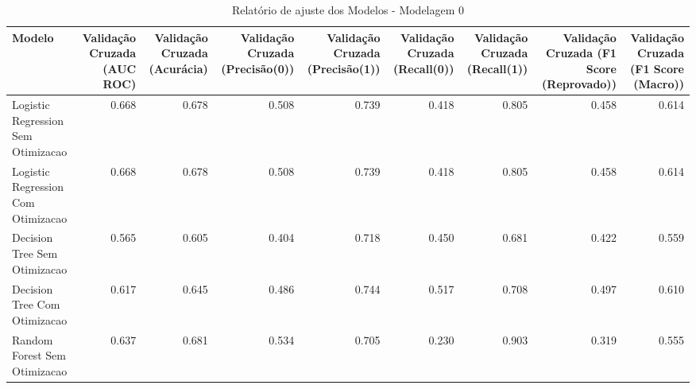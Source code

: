 \begin{table}[H] %
    \centering
    \caption{Relatório de ajuste dos Modelos - Modelagem 0}
    \label{tab:relatorio_ajuste_modelagem_0}
    \renewcommand{\arraystretch}{1.25} %
    \begin{adjustwidth}{ -1in }{ -1in } %
    \centering %
    \small %
    \begin{tabular}{lrrrrrrrr}
\toprule
                            Modelo &  Validação Cruzada (AUC ROC) &  Validação Cruzada (Acurácia) &  Validação Cruzada (Precisão(0)) &  Validação Cruzada (Precisão(1)) &  Validação Cruzada (Recall(0)) &  Validação Cruzada (Recall(1)) &  Validação Cruzada (F1 Score (Reprovado)) &  Validação Cruzada (F1 Score (Macro)) \\
\midrule
Logistic Regression Sem Otimizacao &                        0.668 &                         0.678 &                            0.508 &                            0.739 &                          0.418 &                          0.805 &                                     0.458 &                                 0.614 \\
Logistic Regression Com Otimizacao &                        0.668 &                         0.678 &                            0.508 &                            0.739 &                          0.418 &                          0.805 &                                     0.458 &                                 0.614 \\
      Decision Tree Sem Otimizacao &                        0.565 &                         0.605 &                            0.404 &                            0.718 &                          0.450 &                          0.681 &                                     0.422 &                                 0.559 \\
      Decision Tree Com Otimizacao &                        0.617 &                         0.645 &                            0.486 &                            0.744 &                          0.517 &                          0.708 &                                     0.497 &                                 0.610 \\
      Random Forest Sem Otimizacao &                        0.637 &                         0.681 &                            0.534 &                            0.705 &                          0.230 &                          0.903 &                                     0.319 &                                 0.555 \\

\end{tabular}
\end{adjustwidth}
\end{table}
